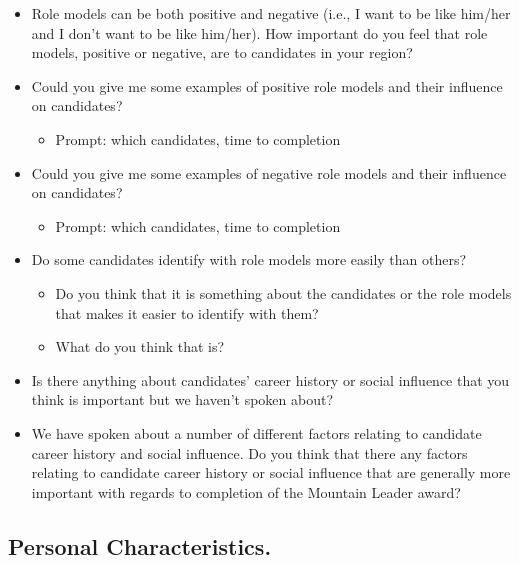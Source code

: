 \documentclass[
  12pt,
  a4paper,
]{book}
\providecommand{\tightlist}{%
  \setlength{\itemsep}{0pt}\setlength{\parskip}{0pt}}
\begin{document}
\begin{itemize}
\tightlist
\item
  Role models can be both positive and negative (i.e., I want to be like him/her and I don't want to be like him/her). How important do you feel that role models, positive or negative, are to candidates in your region?
\item
  Could you give me some examples of positive role models and their influence on candidates?

  \begin{itemize}
  \tightlist
  \item
    Prompt: which candidates, time to completion
  \end{itemize}
\item
  Could you give me some examples of negative role models and their influence on candidates?

  \begin{itemize}
  \tightlist
  \item
    Prompt: which candidates, time to completion
  \end{itemize}
\item
  Do some candidates identify with role models more easily than others?

  \begin{itemize}
  \tightlist
  \item
    Do you think that it is something about the candidates or the role models that makes it easier to identify with them?
  \item
    What do you think that is?
  \end{itemize}
\item
  Is there anything about candidates' career history or social influence that you think is important but we haven't spoken about?
\item
  We have spoken about a number of different factors relating to candidate career history and social influence. Do you think that there any factors relating to candidate career history or social influence that are generally more important with regards to completion of the Mountain Leader award?
\end{itemize}

\hypertarget{personal-characteristics.}{%
\subsection{Personal Characteristics.}\label{personal-characteristics.}}
\end{document}
